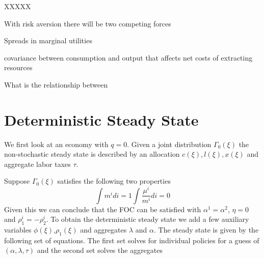 \documentclass[thmsb,11pt]{article}
\begin{document}
XXXXX

With risk aversion there will be two competing forces

Spreads in marginal utilities

covariance between consumption and output that affects net costs of extracting resources  

What is the relationship between 


\section{Deterministic Steady State}
We first look at an economy with $q=0$. Given a joint distribution $\Gamma_0(\xi)$ the non-stochastic steady state is described by an allocation $c(\xi), l(\xi), x(\xi)$ and aggregate labor taxes $\tau$. 

Suppose $\Gamma_0(\xi)$ satisfies the following two properties
   \begin{subequations}
   \label{sys-gamma_0_prop}
	\begin{equation}
	\int m^i di=1
	\end{equation}
	\begin{equation}
	\int \frac{\mu^i}{m^i} di=0
	\end{equation}
   \end{subequations}
Given this we can conclude that the FOC can be satisfied with $\alpha^1=\alpha^2$, $\eta=0$ and $\rho^i_{1}=-\rho^i_2$. To obtain the deterministic steady state we add a few auxiliary variables $\phi(\xi)$,$\rho_1(\xi)$ and aggregates $\lambda$ and $\alpha$. The steady state is given by the following set of equations.  The first set solves for individual policies for a guess of $(\alpha,\lambda,\tau)$ and the second set solves the aggregates
\end{document}
